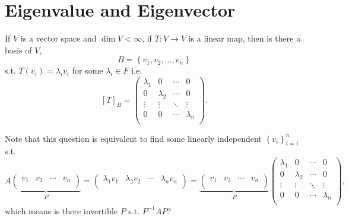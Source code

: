 \chapter{Eigenvalue and Eigenvector}
\begin{question}
    If \(V\) is a vector space and \(\dim V < \infty \), if \(T:V \to V\) is a linear map, then is there a basis of \(V\),
    \[
        B = \left\{ v_1, v_2, \dots , v_n \right\} 
    \] s.t. \(T(v_i) = \lambda _i v_i\) for some \(\lambda _i \in F\) i.e. 
    \[
        [T]_B = \begin{pmatrix}
            \lambda _1 & 0 & \cdots & 0  \\
            0 & \lambda _2 & \cdots & 0  \\
            \vdots & \vdots & \ddots & \vdots  \\
            0 & 0 & \cdots & \lambda _n  \\
        \end{pmatrix}.
    \]  
\end{question}

Note that this question is equivalent to find some linearly independent \(\left\{ v_i \right\}_{i=1}^n \) s.t. 
\[
    A \underbrace{\begin{pmatrix}
        v_1 & v_2 & \cdots & v_n  \\
    \end{pmatrix}}_{P} = \begin{pmatrix}
        \lambda _1 v_1 &\lambda _2 v_2 & \cdots &\lambda _n v_n  \\
    \end{pmatrix} = \underbrace{\begin{pmatrix}
        v_1 & v_2 & \cdots & v_n  \\
    \end{pmatrix}}_{P} \begin{pmatrix}
            \lambda _1 & 0 & \cdots & 0  \\
            0 & \lambda _2 & \cdots & 0  \\
            \vdots & \vdots & \ddots & \vdots  \\
            0 & 0 & \cdots & \lambda _n  \\
        \end{pmatrix}, 
\] which means is there invertible \(P\) s.t. \(P^{-1} A P\)?

